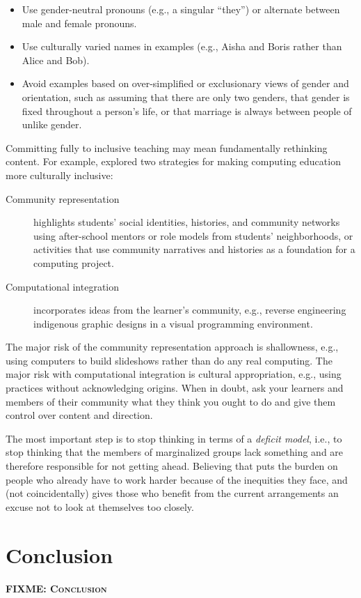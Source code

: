 \documentclass[10pt,letterpaper]{article}
\newcommand{\fixme}[1]{\textsc{\textbf{FIXME: {#1}}}}
\begin{document}
\begin{itemize}

\item Use gender-neutral pronouns (e.g., a singular ``they'') or alternate
  between male and female pronouns.

\item Use culturally varied names in examples (e.g., Aisha and Boris rather than
  Alice and Bob).

\item Avoid examples based on over-simplified or exclusionary views of gender
  and orientation, such as assuming that there are only two genders, that gender
  is fixed throughout a person's life, or that marriage is always between people
  of unlike gender.

\end{itemize}

Committing fully to inclusive teaching may mean fundamentally rethinking
content.  For example, \cite{Lach2018} explored two strategies for making
computing education more culturally inclusive:

\begin{description}

\item[Community representation] highlights students' social identities,
  histories, and community networks using after-school mentors or role models
  from students' neighborhoods, or activities that use community narratives and
  histories as a foundation for a computing project.

\item[Computational integration] incorporates ideas from the learner's
  community, e.g., reverse engineering indigenous graphic designs in a visual
  programming environment.

\end{description}

The major risk of the community representation approach is shallowness, e.g.,
using computers to build slideshows rather than do any real computing.  The
major risk with computational integration is cultural appropriation, e.g., using
practices without acknowledging origins. When in doubt, ask your learners and
members of their community what they think you ought to do and give them control
over content and direction.

The most important step is to stop thinking in terms of a \emph{deficit model},
i.e., to stop thinking that the members of marginalized groups lack something
and are therefore responsible for not getting ahead. Believing that puts the
burden on people who already have to work harder because of the inequities they
face, and (not coincidentally) gives those who benefit from the current
arrangements an excuse not to look at themselves too closely.

\section*{Conclusion}

\fixme{Conclusion}


\end{document}
